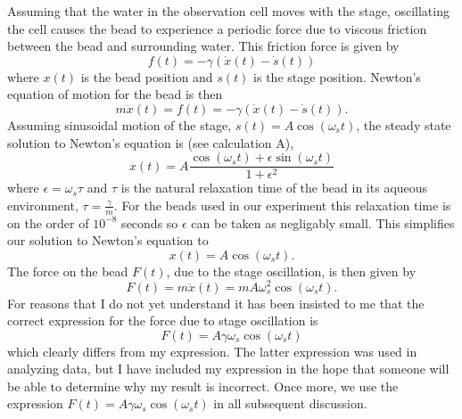 Assuming that the water in the observation cell moves with the stage, oscillating the cell causes the bead to experience a periodic force due to viscous friction between the bead and surrounding water. This friction force is given by
\begin{displaymath}
f(t) = -\gamma (\dot{x}(t) - \dot{s}(t))
\end{displaymath}
where $x(t)$ is the bead position and $s(t)$ is the stage position. Newton's equation of motion for the bead is then
\begin{displaymath}
m \ddot{x}(t) = f(t) = -\gamma (\dot{x}(t) - \dot{s}(t)).
\end{displaymath}
Assuming sinusoidal motion of the stage, $s(t) = A \cos(\omega_s t)$, the steady state solution to Newton's equation is (see calculation A),
\begin{displaymath}
x(t) = A \frac{\cos(\omega_s t) + \epsilon \sin(\omega_s t)}{1 + \epsilon^2}
\end{displaymath}
where $\epsilon = \omega_s \tau$ and $\tau$ is the natural relaxation time of the bead in its aqueous environment, $\tau = \frac{\gamma}{m}$.  For the beads used in our experiment this relaxation time is on the order of $10^{-8}$ seconds so $\epsilon$ can be taken as negligably small. This simplifies our solution to Newton's equation to
\begin{displaymath}
x(t) = A \cos(\omega_s t).
\end{displaymath}
The force on the bead $F(t)$, due to the stage oscillation, is then given by
\begin{displaymath}
F(t) = m\ddot{x}(t) = mA\omega_s^2 \cos (\omega_s t).
\end{displaymath}
For reasons that I do not yet understand it has been insisted to me that the correct expression for the force due to stage oscillation is
\begin{displaymath}
F(t) = A \gamma \omega_s \cos(\omega_s t)
\end{displaymath}
which clearly differs from my expression. The latter expression was used in analyzing data, but I have included my expression in the hope that someone will be able to determine why my result is incorrect. Once more, we use the expression $F(t) = A \gamma \omega_s \cos(\omega_s t)$ in all subsequent discussion.